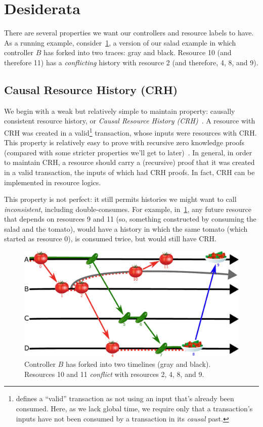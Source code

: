 \documentclass[a4paper,USenglish,cleveref, autoref, thm-restate, anonymous]{lipics-v2021}
\begin{document}
\section{Desiderata}
There are several properties we want our controllers and resource labels to have.
As a running example, consider~\cref{fig:saladfork}, a version of our salad example in which controller $B$ has forked into two traces: gray and black. 
Resource 10 (and therefore 11) has a \emph{conflicting} history with resource 2 (and therefore, 4, 8, and 9).


\subsection{Causal Resource History (CRH)}
We begin with a weak but relatively simple to maintain property: causally consistent resource history, or \emph{Causal Resource History (CRH)}~\cite{causal}.
A resource with CRH was created in a valid\footnote{\cite{resource} defines a ``valid'' transaction as not using an input that's already been consumed.
Here, as we lack global time, we require only that a transaction's inputs have not been consumed by a transaction in its \textit{causal} past.}
transaction, whose inputs were resources with CRH. 
This property is relatively easy to prove with recursive zero knowledge proofs (compared with some stricter properties we'll get to later)~\cite{nova}.
In general, in order to maintain CRH, a resource should carry a (recursive) proof that it was created in a valid transaction, the inputs of which had CRH proofs. 
In fact, CRH can be implemented in resource logics.

This property is not perfect: it still permits histories we might want to call \emph{inconsistent}, including double-consumes.
For example, in~\cref{fig:saladfork}, any future resource that depends on resources 9 and 11 (so, something constructed by consuming the salad and the tomato), would have a history in which the same tomato (which started as resource 0), is consumed twice, but would still have CRH.



\begin{figure}
    \centering
    \centerline{
    \includegraphics[width=0.85\linewidth]{figs/salad_timeline_fork.pdf}
    }
    \caption{Controller $B$ has forked into two timelines (gray and black).
             Resources 10 and 11 \emph{conflict} with resources 2, 4, 8, and 9.}
    \label{fig:saladfork}
\end{figure}
\end{document}
